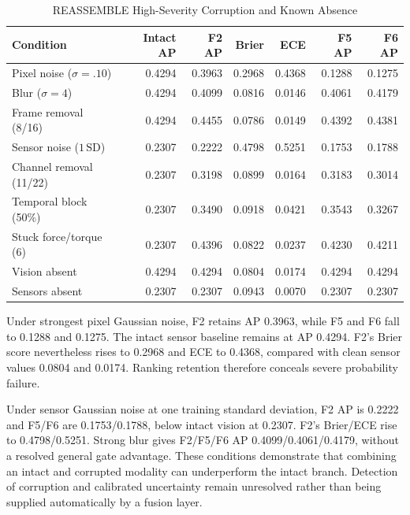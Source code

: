 \begin{table}[htbp]
\caption{REASSEMBLE High-Severity Corruption and Known Absence}
\label{tab:reassemble-corruption}
\centering\small\setlength{\tabcolsep}{3pt}
\begin{tabular}{lrrrrrr}\toprule
Condition & Intact AP & F2 AP & Brier & ECE & F5 AP & F6 AP\\\midrule
Pixel noise ($\sigma=.10$) & 0.4294 & 0.3963 & 0.2968 & 0.4368 & 0.1288 & 0.1275\\
Blur ($\sigma=4$) & 0.4294 & 0.4099 & 0.0816 & 0.0146 & 0.4061 & 0.4179\\
Frame removal (8/16) & 0.4294 & 0.4455 & 0.0786 & 0.0149 & 0.4392 & 0.4381\\
Sensor noise ($1\,\mathrm{SD}$) & 0.2307 & 0.2222 & 0.4798 & 0.5251 & 0.1753 & 0.1788\\
Channel removal (11/22) & 0.2307 & 0.3198 & 0.0899 & 0.0164 & 0.3183 & 0.3014\\
Temporal block (50\%) & 0.2307 & 0.3490 & 0.0918 & 0.0421 & 0.3543 & 0.3267\\
Stuck force/torque (6) & 0.2307 & 0.4396 & 0.0822 & 0.0237 & 0.4230 & 0.4211\\
Vision absent & 0.4294 & 0.4294 & 0.0804 & 0.0174 & 0.4294 & 0.4294\\
Sensors absent & 0.2307 & 0.2307 & 0.0943 & 0.0070 & 0.2307 & 0.2307\\
\bottomrule\end{tabular}
\end{table}

Under strongest pixel Gaussian noise, F2 retains AP 0.3963, while F5 and F6 fall to
0.1288 and 0.1275. The intact sensor baseline remains at AP 0.4294. F2's Brier score
nevertheless rises to 0.2968 and ECE to 0.4368, compared with clean sensor values 0.0804
and 0.0174. Ranking retention therefore conceals severe probability failure.

Under sensor Gaussian noise at one training standard deviation, F2 AP is 0.2222 and
F5/F6 are 0.1753/0.1788, below intact vision at 0.2307. F2's Brier/ECE rise to
0.4798/0.5251. Strong blur gives F2/F5/F6 AP 0.4099/0.4061/0.4179, without a resolved
general gate advantage. These conditions demonstrate that combining an intact and
corrupted modality can underperform the intact branch. Detection of corruption and
calibrated uncertainty remain unresolved rather than being supplied automatically by a
fusion layer.

